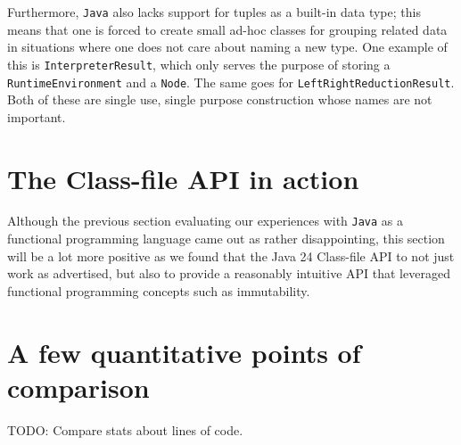 Furthermore, \texttt{Java} also lacks support for tuples as a built-in data type; this means that one is forced to create small ad-hoc
classes for grouping related data in situations where one does not care about naming a new type. One example of this is \texttt{InterpreterResult},
which only serves the purpose of storing a \texttt{RuntimeEnvironment} and a \texttt{Node}. The same goes for \texttt{LeftRightReductionResult}.
Both of these are single use, single purpose construction whose names are not important.

\section{The Class-file API in action}

Although the previous section evaluating our experiences with \texttt{Java} as a functional programming language came out as rather disappointing,
this section will be a lot more positive as we found that the Java 24 Class-file API to not just work as advertised, but also to provide a
reasonably intuitive API that leveraged functional programming concepts such as immutability.

\section{A few quantitative points of comparison}

TODO: Compare stats about lines of code.
